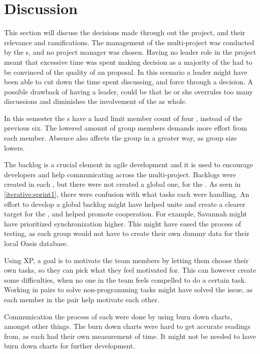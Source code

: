 \chapter{Discussion}
This section will discuss the decisions made through out the project, and their relevance and ramifications. 
The management of the multi-project was conducted by the \localgroup[]s, and no project manager was chosen.
Having no leader role in the project meant that excessive time was spent making decision as a majority of the \globalgroup[] had to be convinced of the quality of an proposal.
In this scenario a leader might have been able to cut down the time spent discussing, and force through a decision.
A possible drawback of having a leader, could be that he or she overrules too many discussions and diminishes the involvement of the \globalgroup[] as whole.

In this semester the \localgroup[]s have a hard limit member count of four \citep{web:rammestudyreg}, instead of the previous six.
The lowered amount of group members demands more effort from each member.
Absence also affects the group in a greater way, as group size lowers.

The backlog is a crucial element in agile development and it is used to encourage developers and help communicating across the multi-project.
Backlogs were created in each \localgroup[], but there were not created a global one, for the \globalgroup[].
As seen in \autoref{iterative:sprint1}, there were confusion with what tasks each \localgroup[] were handling.
An effort to develop a global backlog might have helped unite and create a clearer target for the \globalgroup[], and helped promote cooperation.
For example, Savannah might have prioritized synchronization higher.
This might have eased the process of testing, as each group would not have to create their own dummy data for their local Oasis database.

Using XP, a goal is to motivate the team members by letting them choose their own tasks, so they can pick what they feel motivated for.  This can however create some difficulties, when no one in the team feels compelled to do a certain task.
Working in pairs to solve non-programming tasks might have solved the issue, as each member in the pair help motivate each other. 

Communication the process of each \localgroup[] were done by using burn down charts, amongst other things.
The burn down charts were hard to get accurate readings from, as each \localgroup[] had their own measurement of time.
It might not be needed to have burn down charts for further development. 

